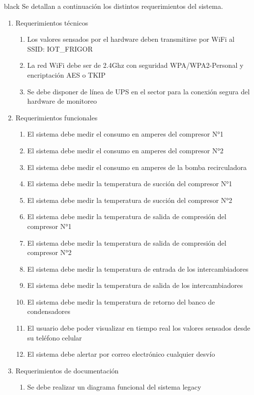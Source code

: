 \documentclass[
11pt, %
]{charter}
\begin{document}
\begin{consigna}{black}
Se detallan a continuación los distintos requerimientos del sistema.
\begin{enumerate}
	\item Requerimientos técnicos
		\begin{enumerate}
			\item Los valores sensados por el hardware deben transmitirse por WiFi al SSID: IOT\_FRIGOR
			\item La red WiFi debe ser de 2.4Ghz con seguridad WPA/WPA2-Personal y encriptación AES o TKIP
			\item Se debe disponer de línea de UPS en el sector para la conexión segura del hardware de monitoreo
		\end{enumerate}
	\item Requerimientos funcionales
		\begin{enumerate}
			\item El sistema debe medir el consumo en amperes del compresor N°1
			\item El sistema debe medir el consumo en amperes del compresor N°2
			\item El sistema debe medir el consumo en amperes de la bomba recirculadora
			\item El sistema debe medir la temperatura de succión del compresor N°1
			\item El sistema debe medir la temperatura de succión del compresor N°2
			\item El sistema debe medir la temperatura de salida de compresión del compresor N°1
			\item El sistema debe medir la temperatura de salida de compresión del compresor N°2
			\item El sistema debe medir la temperatura de entrada de los intercambiadores
			\item El sistema debe medir la temperatura de salida de los intercambiadores
			\item El sistema debe medir la temperatura de retorno del banco de condensadores
			\item El usuario debe poder visualizar en tiempo real los valores sensados desde su teléfono celular
			\item El sistema debe alertar por correo electrónico cualquier desvío
		\end{enumerate}
	\item Requerimientos de documentación
		\begin{enumerate}		
			\item Se debe realizar un diagrama funcional del sistema legacy

\end{enumerate}
\end{enumerate}
\end{consigna}
\end{document}
